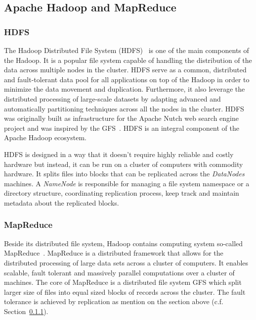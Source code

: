 \subsection{Apache Hadoop and MapReduce}

\subsubsection{HDFS}
\label{sec:hdfs}
The Hadoop Distributed File System (\gls{HDFS})~\cite{Shvachko:2010:HDF:1913798.1914427} is one of the main components of the Hadoop. 
It is a popular file system capable of handling the distribution of the data across multiple nodes in the cluster.
HDFS serve as a common, distributed and fault-tolerant data pool for all applications on top of the Hadoop in order to minimize the data movement and duplication.
Furthermore, it also leverage the distributed processing of large-scale datasets by adapting advanced and automatically partitioning techniques across all the nodes in the cluster.
\gls{HDFS} was originally built as infrastructure for the Apache Nutch web search engine project and was inspired by the \gls{GFS}~\cite{Ghemawat:2003:GFS:945445.945450}. 
\gls{HDFS} is an integral component of the Apache Hadoop ecosystem.

\gls{HDFS} is designed in a way that it doesn't require highly reliable and costly hardware but instead, it can be run on a cluster of computers with commodity hardware.
It splits files into blocks that can be replicated across the \textit{DataNodes} machines.
A \textit{NameNode} is responsible for managing a file system namespace or a directory structure, coordinating replication process, keep track and maintain metadata about the replicated blocks.



\subsubsection{MapReduce}
Beside its distributed file system, Hadoop contains computing system so-called MapReduce~\cite{dg2004mapreduce}.
MapReduce is a distributed framework that allows for the distributed processing of large data sets across a cluster of computers.
It enables scalable, fault tolerant and massively parallel computations over a cluster of machines.
The core of MapReduce is a distributed file system \gls{GFS} which split larger size of files into equal sized blocks of records across the cluster. 
The fault tolerance is achieved by replication as mention on the section above (c.f. Section~\ref{sec:hdfs}).



